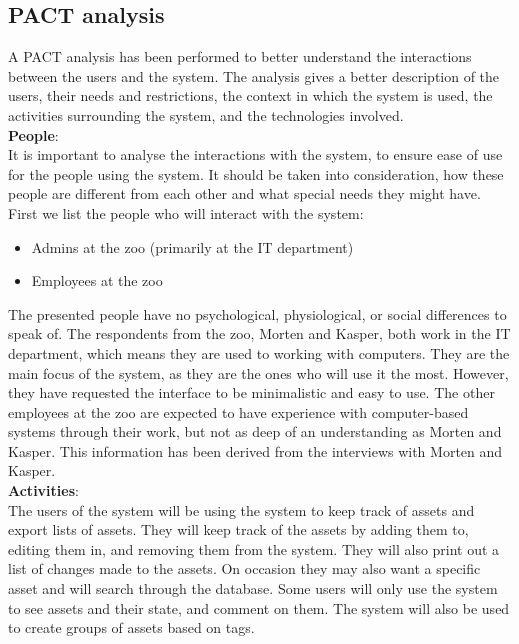 \subsection{PACT analysis}\label{ssc:PACT}
A PACT analysis \cite[chap 2]{DEB} has been performed to better understand the interactions between the users and the system. The analysis gives a better description of the users, their needs and restrictions, the context in which the system is used, the activities surrounding the system, and the technologies involved.\\

\textbf{People}:\\
It is important to analyse the interactions with the system, to ensure ease of use for the people using the system. It should be taken into consideration, how these people are different from each other and what special needs they might have. First we list the people who will interact with the system:

\begin{itemize}
    \setlength\itemsep{0.05em}
    \item Admins at the zoo (primarily at the IT department)
    \item Employees at the zoo
\end{itemize}

The presented people have no psychological, physiological, or social differences to speak of. The respondents from the zoo, Morten and Kasper, both work in the IT department, which means they are used to working with computers. They are the main focus of the system, as they are the ones who will use it the most. However, they have requested the interface to be minimalistic and easy to use. The other employees at the zoo are expected to have experience with computer-based systems through their work, but not as deep of an understanding as Morten and Kasper. This information has been derived from the interviews with Morten and Kasper.\\

\textbf{Activities}: \\
The users of the system will be using the system to keep track of assets and export lists of assets. They will keep track of the assets by adding them to, editing them in, and removing them from the system. They will also print out a list of changes made to the assets. On occasion they may also want a specific asset and will search through the database. Some users will only use the system to see assets and their state, and comment on them. The system will also be used to create groups of assets based on tags.\\

